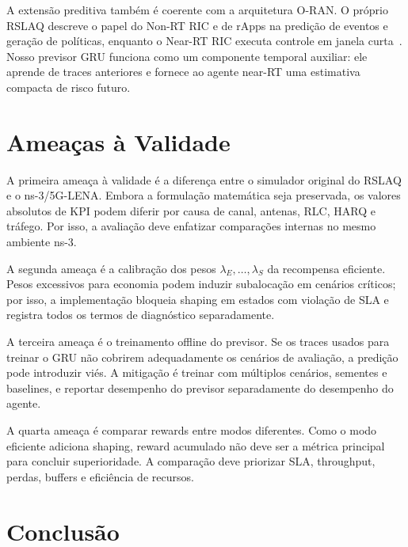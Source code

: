 \documentclass[10pt,a4paper]{IEEEtran}
\begin{document}
A extens\~{a}o preditiva tamb\'{e}m \'{e} coerente com a
arquitetura O-RAN. O pr\'{o}prio RSLAQ descreve o papel do
Non-RT RIC e de rApps na predi\c{c}\~{a}o de eventos e
gera\c{c}\~{a}o de pol\'{i}ticas, enquanto o Near-RT RIC
executa controle em janela curta~\cite{yungaicela2026rslaq}.
Nosso previsor GRU funciona como um componente temporal
auxiliar: ele aprende de traces anteriores e fornece ao agente
near-RT uma estimativa compacta de risco futuro.

\section{Amea\c{c}as \`{a} Validade}
\label{sec:ameacas}

A primeira amea\c{c}a \`{a} validade \'{e} a diferen\c{c}a
entre o simulador original do RSLAQ e o ns-3/5G-LENA. Embora a
formula\c{c}\~{a}o matem\'{a}tica seja preservada, os valores
absolutos de KPI podem diferir por causa de canal, antenas,
RLC, HARQ e tr\'{a}fego. Por isso, a avalia\c{c}\~{a}o deve
enfatizar compara\c{c}\~{o}es internas no mesmo ambiente ns-3.

A segunda amea\c{c}a \'{e} a calibra\c{c}\~{a}o dos pesos
$\lambda_E,\dots,\lambda_S$ da recompensa eficiente. Pesos
excessivos para economia podem induzir subaloca\c{c}\~{a}o em
cen\'{a}rios cr\'{i}ticos; por isso, a implementa\c{c}\~{a}o
bloqueia shaping em estados com viola\c{c}\~{a}o de SLA e
registra todos os termos de diagn\'{o}stico separadamente.

A terceira amea\c{c}a \'{e} o treinamento offline do previsor.
Se os traces usados para treinar o GRU n\~{a}o cobrirem
adequadamente os cen\'{a}rios de avalia\c{c}\~{a}o, a
predi\c{c}\~{a}o pode introduzir vi\'{e}s. A
mitiga\c{c}\~{a}o \'{e} treinar com m\'{u}ltiplos
cen\'{a}rios, sementes e baselines, e reportar desempenho do
previsor separadamente do desempenho do agente.

A quarta amea\c{c}a \'{e} comparar rewards entre modos
diferentes. Como o modo eficiente adiciona shaping, reward
acumulado n\~{a}o deve ser a m\'{e}trica principal para
concluir superioridade. A compara\c{c}\~{a}o deve priorizar
SLA, throughput, perdas, buffers e efici\^{e}ncia de recursos.

\section{Conclus\~{a}o}
\label{sec:conclusao}
\end{document}
